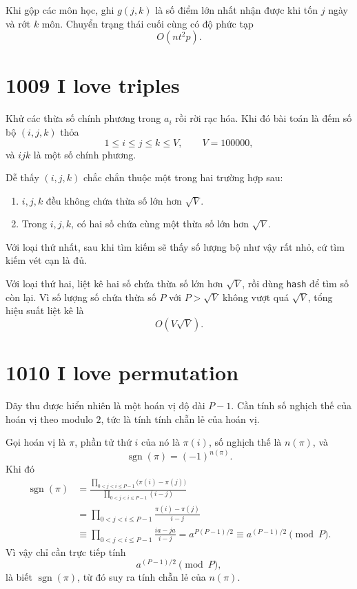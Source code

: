 \documentclass[11pt]{article}
\begin{document}
Khi gộp các môn học, ghi $g(j,k)$ là số điểm lớn nhất nhận được khi tốn $j$
ngày và rớt $k$ môn. Chuyển trạng thái cuối cùng có độ phức tạp
\[
  O(n t^2 p).
\]

\section{1009 I love triples}

Khử các thừa số chính phương trong $a_i$ rồi rời rạc hóa. Khi đó bài toán là
đếm số bộ $(i,j,k)$ thỏa
\[
  1 \le i \le j \le k \le V,\qquad V=100000,
\]
và $ijk$ là một số chính phương.

Dễ thấy $(i,j,k)$ chắc chắn thuộc một trong hai trường hợp sau:
\begin{enumerate}
  \item $i,j,k$ đều không chứa thừa số lớn hơn $\sqrt V$.
  \item Trong $i,j,k$, có hai số chứa cùng một thừa số lớn hơn $\sqrt V$.
\end{enumerate}

Với loại thứ nhất, sau khi tìm kiếm sẽ thấy số lượng bộ như vậy rất nhỏ, cứ
tìm kiếm vét cạn là đủ.

Với loại thứ hai, liệt kê hai số chứa thừa số lớn hơn $\sqrt V$, rồi dùng
\texttt{hash} để tìm số còn lại. Vì số lượng số chứa thừa số $P$ với
$P>\sqrt V$ không vượt quá $\sqrt V$, tổng hiệu suất liệt kê là
\[
  O(V\sqrt V).
\]

\section{1010 I love permutation}

Dãy thu được hiển nhiên là một hoán vị độ dài $P-1$. Cần tính số nghịch thế
của hoán vị theo modulo $2$, tức là tính tính chẵn lẻ của hoán vị.

Gọi hoán vị là $\pi$, phần tử thứ $i$ của nó là $\pi(i)$, số nghịch thế là
$n(\pi)$, và
\[
  \operatorname{sgn}(\pi)=(-1)^{n(\pi)}.
\]
Khi đó
\[
\begin{aligned}
  \operatorname{sgn}(\pi)
  &= \frac{\prod_{0<j<i\le P-1}\bigl(\pi(i)-\pi(j)\bigr)}
          {\prod_{0<j<i\le P-1}(i-j)}  \\
  &= \prod_{0<j<i\le P-1}\frac{\pi(i)-\pi(j)}{i-j} \\
  &\equiv \prod_{0<j<i\le P-1}\frac{ia-ja}{i-j}
   = a^{P(P-1)/2}
   \equiv a^{(P-1)/2}\pmod P.
\end{aligned}
\]
Vì vậy chỉ cần trực tiếp tính
\[
  a^{(P-1)/2}\pmod P,
\]
là biết $\operatorname{sgn}(\pi)$, từ đó suy ra tính chẵn lẻ của $n(\pi)$.
\end{document}
